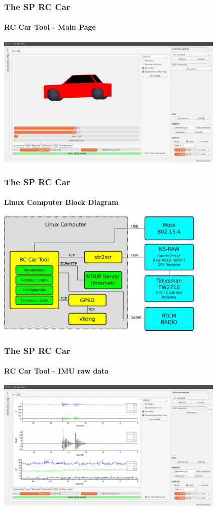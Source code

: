 \documentclass[aspectratio=169,electronics,notopline]{beamer}
\begin{document}
\begin{frame} 
\frametitle{The SP RC Car}
\framesubtitle{RC Car Tool - Main Page}
\begin{center}
	\includegraphics[width=11cm]{Figures/GUI/car_orientation.png}
\end{center}
\end{frame}

\begin{frame} 
\frametitle{The SP RC Car}
\framesubtitle{Linux Computer Block Diagram}
\begin{center}
	\includegraphics[width=10cm]{Figures/linux_diagram.pdf}
\end{center}
\end{frame}

\begin{frame} 
\frametitle{The SP RC Car}
\framesubtitle{RC Car Tool - IMU raw data}
\begin{center}
	\includegraphics[width=11cm]{Figures/GUI/car_imu.png}
\end{center}
\end{frame}
\end{document}
